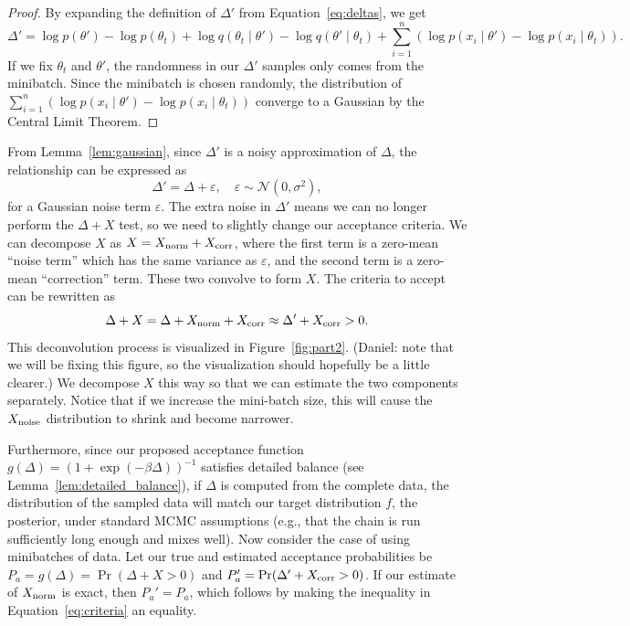 \documentclass{article}
\begin{document}
\begin{proof}
By expanding the definition of $\Delta'$ from Equation~\ref{eq:deltas}, we get
\[
\Delta' = \log p(\theta') - \log p(\theta_t) + \log q(\theta_t \mid \theta') - \log q(\theta' \mid \theta_t) +
\sum_{i=1}^n (\log p(x_i\mid \theta') - \log p(x_i\mid \theta_t)).
\]
If we fix $\theta_t$ and $\theta'$, the randomness in our $\Delta'$ samples only comes from the
minibatch. Since the minibatch is chosen randomly, the distribution of $\sum_{i=1}^n (\log p(x_i\mid
\theta') - \log p(x_i\mid \theta_t))$ converge to a Gaussian by the Central Limit Theorem.
\end{proof}

From Lemma~\ref{lem:gaussian}, since $\Delta'$ is a noisy approximation of $\Delta$, the
relationship can be expressed as
\begin{equation}\label{eq:relationship}
\Delta' = \Delta + \varepsilon, \quad \varepsilon \sim \mathcal{N}(0, \sigma^2),
\end{equation}
for a Gaussian noise term $\varepsilon$.  The extra noise in $\Delta'$ means we can no longer perform
the $\Delta + X$ test, so we need to slightly change our acceptance criteria. We can decompose
$X$ as $X = X_{\rm norm}+X_{\rm corr}$, where the first term is a zero-mean ``noise term'' which
has the same variance as $\varepsilon$, and the second term is a zero-mean ``correction'' term.
These two convolve to form $X$. The criteria to accept can be rewritten as
\begin{equation}\label{eq:criteria}
\Delta + X = \Delta + X_{\rm norm} + X_{\rm corr} \approx \Delta' + X_{\rm corr} >0.
\end{equation}
This deconvolution process is visualized in Figure~\ref{fig:part2}. {\color{blue} (Daniel: note that
we will be fixing this figure, so the visualization should hopefully be a little clearer.)} We
decompose $X$ this way so that we can estimate the two components separately.  Notice that if we
increase the mini-batch size, this will cause the $X_{\rm noise}$ distribution to shrink and become
narrower.

Furthermore, since our proposed acceptance function $g(\Delta) = (1+ \exp(-\beta \Delta))^{-1}$ satisfies
detailed balance (see Lemma~\ref{lem:detailed_balance}), if $\Delta$ is computed from the complete
data, the distribution of the sampled data will match our target distribution $f$, the posterior,
under standard MCMC assumptions (e.g., that the chain is run sufficiently long enough and mixes
well). Now consider the case of using minibatches of data. Let our true and estimated acceptance
probabilities be $P_a = g(\Delta) = \Pr(\Delta + X > 0)$ and $P_a' = \Pr(\Delta' + X_{\rm corr} >
0)$.  If our estimate of $X_{\rm norm}$ is exact, then $P_a' = P_a$, which follows by making the
inequality in Equation~\ref{eq:criteria} an equality.
\end{document}
